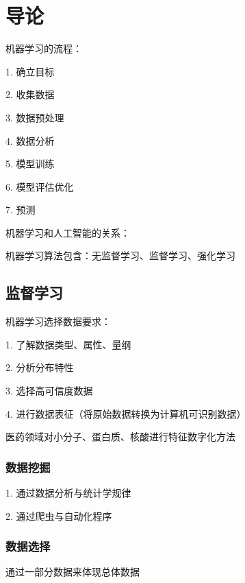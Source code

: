 \section{导论}%
\label{sec:导论}
\begin{notation}
    机器学习的流程：

    1. 确立目标

    2. 收集数据

    3. 数据预处理
    
    4. 数据分析

    5. 模型训练

    6. 模型评估优化

    7. 预测
\end{notation}

机器学习和人工智能的关系：
\begin{center}
\end{center}

机器学习算法包含：无监督学习、监督学习、强化学习
\subsection{监督学习}%
\label{sub:监督学习}
\begin{notation}
    机器学习选择数据要求：

    1. 了解数据类型、属性、量纲

    2. 分析分布特性

    3. 选择高可信度数据

    4. 进行数据表征（将原始数据转换为计算机可识别数据）
\end{notation}
\begin{eg}
    医药领域对小分子、蛋白质、核酸进行特征数字化方法
\end{eg}
\subsubsection{数据挖掘}%
\label{subsub:数据挖掘}
1. 通过数据分析与统计学规律

2. 通过爬虫与自动化程序
\subsubsection{数据选择}%
\label{subsub:数据选择}
通过一部分数据来体现总体数据
